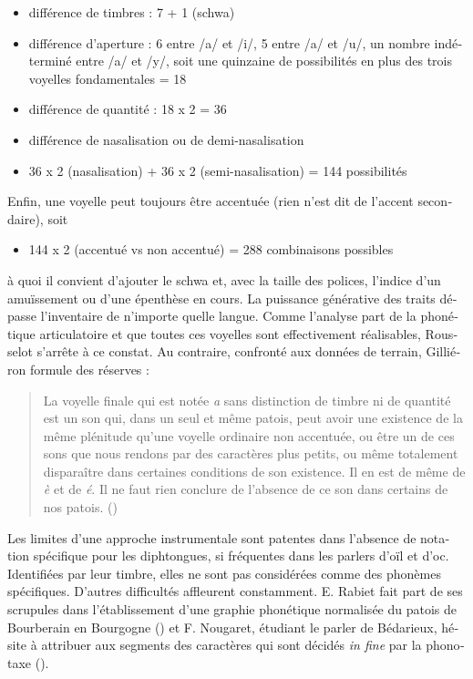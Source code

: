 \documentclass[french,output=paper,colorlinks,citecolor=brown]{../langscibook}
\begin{document}
\begin{otherlanguage}{french}
\begin{itemize}
    \item différence de timbres : 7 + 1 (schwa)
    \item différence d’aperture : 6 entre /a/ et /i/, 5 entre /a/ et /u/, un nombre indéterminé entre /a/ et /y/, soit une quinzaine de possibilités en plus des trois voyelles fondamentales = 18
    \item différence de quantité : 18 x 2 = 36
    \item différence de nasalisation ou de demi-nasalisation
    \item 36 x 2 (nasalisation) + 36 x 2 (semi-nasalisation) = 144 possibilités
\end{itemize}

Enfin, une voyelle peut toujours être accentuée (rien n’est dit de l’accent secondaire), soit

\begin{itemize}
      \item 144 x 2 (accentué vs non accentué) = 288 combinaisons possibles 
\end{itemize}

à quoi il convient d’ajouter le schwa et, avec la taille des polices, l’indice d’un amuïssement ou d’une épenthèse en cours. La puissance générative des traits dépasse l’inventaire de n’importe quelle langue. Comme l’analyse part de la phonétique articulatoire et que toutes ces voyelles sont effectivement réalisables, Rousselot s’arrête à ce constat. Au contraire, confronté aux données de terrain, Gilliéron formule des réserves :

\begin{quote}
    La voyelle finale qui est notée \textit{a} sans distinction de timbre ni de quantité est un son qui, dans un seul et même patois, peut avoir une existence de la même plénitude qu’une voyelle ordinaire non accentuée, ou être un de ces sons que nous rendons par des caractères plus petits, ou même totalement disparaître dans certaines conditions de son existence. Il en est de même de \textit{è} et de \textit{é}. Il ne faut rien conclure de l’absence de ce son dans certains de nos patois. (\citealt[33--34n]{Gilliéron1888})
\end{quote}

Les limites d’une approche instrumentale sont patentes dans l’absence de notation spécifique pour les diphtongues, si fréquentes dans les parlers d’oïl et d’oc. Identifiées par leur timbre, elles ne sont pas considérées comme des phonèmes spécifiques. D’autres difficultés affleurent constamment. E. Rabiet fait part de ses scrupules dans l’établissement d’une graphie phonétique normalisée du patois de Bourberain en Bourgogne (\citeyear[243]{Rabiet1887}) et F. Nougaret, étudiant le parler de Bédarieux, hésite à attribuer aux segments des caractères qui sont décidés \textit{in fine} par la phonotaxe (\citeyear[216]{Nougaret1890}).


\end{otherlanguage}
\end{document}
